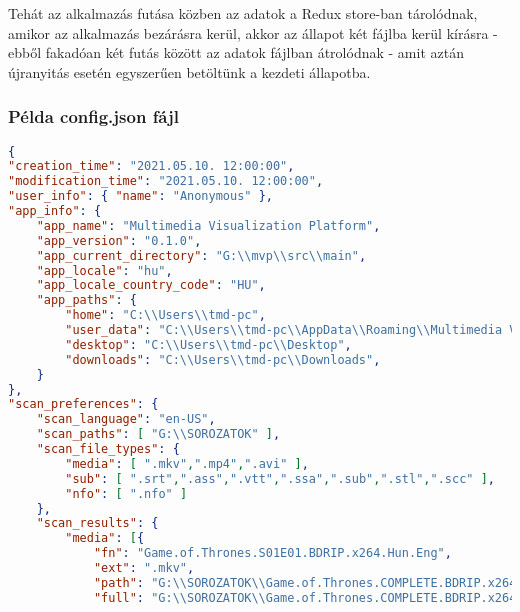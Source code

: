 Tehát az alkalmazás futása közben az adatok a Redux store-ban tárolódnak, amikor az alkalmazás bezárásra kerül, akkor az állapot két fájlba kerül kírásra - ebből fakadóan két futás között az adatok fájlban átrolódnak - amit aztán újranyitás esetén egyszerűen betöltünk a kezdeti állapotba.

\subsubsection{Példa config.json fájl}

\begin{lstlisting}[language={json}]
{
"creation_time": "2021.05.10. 12:00:00",
"modification_time": "2021.05.10. 12:00:00",
"user_info": { "name": "Anonymous" },
"app_info": {
    "app_name": "Multimedia Visualization Platform",
    "app_version": "0.1.0",
    "app_current_directory": "G:\\mvp\\src\\main",
    "app_locale": "hu",
    "app_locale_country_code": "HU",
    "app_paths": {
        "home": "C:\\Users\\tmd-pc",
        "user_data": "C:\\Users\\tmd-pc\\AppData\\Roaming\\Multimedia Visualization Platform",
        "desktop": "C:\\Users\\tmd-pc\\Desktop",
        "downloads": "C:\\Users\\tmd-pc\\Downloads",
    }
},
"scan_preferences": {
    "scan_language": "en-US",
    "scan_paths": [ "G:\\SOROZATOK" ],
    "scan_file_types": {
        "media": [ ".mkv",".mp4",".avi" ],
        "sub": [ ".srt",".ass",".vtt",".ssa",".sub",".stl",".scc" ],
        "nfo": [ ".nfo" ]
    },
    "scan_results": {
        "media": [{
            "fn": "Game.of.Thrones.S01E01.BDRIP.x264.Hun.Eng",
            "ext": ".mkv",
            "path": "G:\\SOROZATOK\\Game.of.Thrones.COMPLETE.BDRIP.x264.Hun.Eng",
            "full": "G:\\SOROZATOK\\Game.of.Thrones.COMPLETE.BDRIP.x264.Hun.Eng\\Game.of.Thrones.S01E01.BDRIP.x264.Hun.Eng.mkv"

\end{lstlisting}
